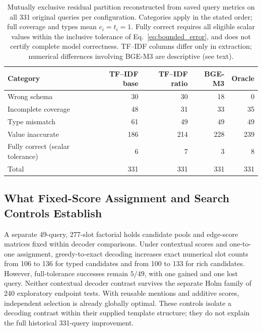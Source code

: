 \documentclass[pdflatex,iicol,sn-basic,Numbered]{sn-jnl}
\begin{document}
\begin{table}[t]
  \centering
  \renewcommand{\arraystretch}{1.18}
  \caption{Mutually exclusive residual partition reconstructed from saved query metrics on all 331 original queries per configuration. Categories apply in the stated order; full coverage and types mean $c_i=t_i=1$. Fully correct requires all eligible scalar values within the inclusive tolerance of Eq.~\eqref{eq:bounded_error}, and does not certify complete model correctness. TF--IDF columns differ only in extraction; numerical differences involving BGE-M3 are descriptive (see text).}
  \label{tab:nlp4lp-error-taxonomy}
  \small
  \setlength{\tabcolsep}{4pt}
  \begin{tabular}{lrrrr}
    \toprule
    Category & TF--IDF base & TF--IDF ratio & BGE-M3 & Oracle \\
    \midrule
Wrong schema & 30 & 30 & 18 & 0 \\
Incomplete coverage & 48 & 31 & 33 & 35 \\
Type mismatch & 61 & 49 & 49 & 49 \\
Value inaccurate & 186 & 214 & 228 & 239 \\
Fully correct (scalar tolerance) & 6 & 7 & 3 & 8 \\
Total & 331 & 331 & 331 & 331 \\
    \bottomrule
  \end{tabular}
\end{table}
\subsection{What Fixed-Score Assignment and Search Controls Establish}
\label{subsec:grounding-followup}
A separate 49-query, 277-slot factorial holds candidate pools and edge-score matrices fixed within decoder comparisons. Under contextual scores and one-to-one assignment, greedy-to-exact decoding increases exact numerical slot counts from 106 to 136 for typed candidates and from 100 to 133 for rich candidates. However, full-tolerance successes remain $5/49$, with one gained and one lost query. Neither contextual decoder contrast survives the separate Holm family of 240 exploratory endpoint tests. With reusable mentions and additive scores, independent selection is already globally optimal. These controls isolate a decoding contrast within their supplied template structure; they do not explain the full historical 331-query improvement.
\end{document}
